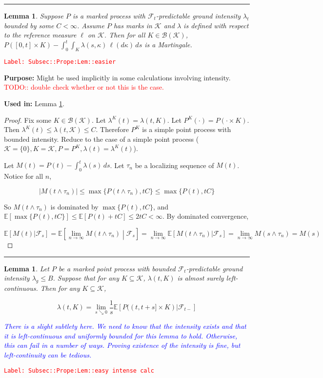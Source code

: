 \documentclass[12pt]{article}
\newcommand{\mb}{\mathbb}
\newcommand{\mc}{\mathcal}
\newcommand{\ms}{\mathscr}
\newcommand{\ra}{\rightarrow}
\newcommand{\tr}{\textcolor{red}}
\newcommand{\tb}{\textcolor{blue}}
\newcommand{\labe}[1]{\tr{\texttt{Label: #1}}}
\newcommand{\purpose}{\textbf{Purpose: }}
\newcommand{\usein}{\textbf{Used in: }}
\newcommand{\lin}{\rule{\linewidth}{0.4 pt}}
\newcommand{\ex}[1]{\mb{E}\left[#1\right]}			%
\renewcommand{\S}{S}							%
\renewcommand{\t}{t}							%
\renewcommand{\tt}{s}							%
\newcommand{\F}{\mc{F}}							%
\newcommand{\ts}[1]{_{#1}}						%
\newcommand{\const}{C}							%
\newcommand{\Sm}{\ell}							%
\newcommand{\rate}{\lambda}						%
\newcommand{\indx}[1]{_{#1}}					%
\newcommand{\rt}{\tau}							%
\renewcommand{\mark}{\kappa}					%
\newcommand{\rp}{P}								%
\newcommand{\gid}[1]{^{#1}}						%
\newcommand{\mspce}{\mc{K}}						%
\newtheorem{lem}[thms]{Lemma}
\begin{document}
\lin

\begin{lem}
Suppose \(\rp\) is a marked process with \(\F\ts{\t}\)-predictable ground intensity \(\rate\ts{\t}\) bounded by some \(\const < \infty\). Assume \(\rp\) has marks in \(\mspce\) and \(\rate\) is defined with respect to the reference measure \(\Sm\) on \(\mspce\). Then for all \(K \in \ms{B}(\mspce)\), \(\rp([0,\t]\times K) - \int_0^\t\int_K \rate(\tt,\mark)\,\ell(d\mark)\,ds\) is a Martingale.
\label{Subsec::Prope:Lem::easier}
\end{lem}
\labe{Subsec::Prope:Lem::easier}

\purpose Might be used implicitly in some calculations involving intensity. \tr{TODO:: double check whether or not this is the case.}

\usein Lemma \ref{Subsec::Prope:Lem::easy intense calc}.

\begin{proof}
Fix some \(K \in \ms{B}(\mspce)\). Let \(\rate\gid{K}(\t) = \rate(\t,K)\). Let \(\rp\gid{K}(\cdot) = \rp(\cdot\times K)\). Then \(\rate\gid{K}(\t) \leq \rate(\t,\mspce) \leq \const\). Therefore \(\rp\gid{K}\) is a simple point process with bounded intensity. Reduce to the case of a simple point process (\(\mspce = \{0\}, K = \mspce, \rp = \rp\gid{K},\rate(\t) = \rate\gid{K}(\t)\)).

Let \(M(\t) = \rp(\t) - \int_0^\t \rate(\tt)\,ds\). Let \(\rt\indx{n}\) be a localizing sequence of \(M(\t)\). Notice for all \(n\),

\[|M(\t\wedge \rt\indx{n})| \leq \max\{\rp(\t\wedge \rt\indx{n}),\t\const\}\leq \max\{\rp(\t),\t\const\}\]

So \(M(\t\wedge\rt\indx{n})\) is dominated by \(\max\{\rp(\t),\t\const\}\), and \(\ex{\max\{\rp(\t),\t\const\}} \leq \ex{\rp(\t) + \t\const} \leq 2\t\const < \infty\). By dominated convergence,

\[\ex{M(\t)|\F\ts{\tt}} = \ex{\lim_{n\ra\infty} M(\t\wedge \rt\indx{n})\middle|\F\ts{\tt}} = \lim_{n\ra\infty}\ex{M(\t\wedge \rt\indx{n})|\F\ts{\tt}} = \lim_{n\ra\infty} M(\tt\wedge \rt\indx{n}) = M(\tt)\]
\end{proof}

\lin

\begin{lem}
Let \(\rp\) be a marked point process with bounded \(\F\ts{\t}\)-predictable ground intensity \(\rate_g\leq B\). Suppose that for any \(K \subseteq \mspce\), \(\rate(\t,K)\) is almost surely left-continuous. Then for any \(K \subseteq \mspce\),

\[\rate(\t,K) = \lim_{s\searrow 0}\frac{1}{\tt}\ex{\rp((\t,\t+\tt]\times K)|\F\ts{\t-}}\]

\tb{There is a slight subtlety here. We need to know that the intensity exists and that it is left-continuous and uniformly bounded for this lemma to hold. Otherwise, this can fail in a number of ways. Proving existence of the intensity is fine, but left-continuity can be tedious.}

\label{Subsec::Prope:Lem::easy intense calc}
\end{lem}
\labe{Subsec::Prope:Lem::easy intense calc}
\end{document}
